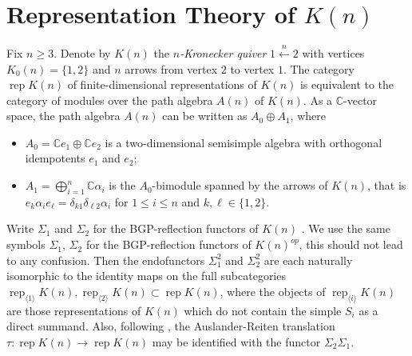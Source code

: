 \documentclass{amsart}
\newcommand{\rep}{\operatorname{rep}}
\newcommand{\CC}{\mathbb{C}}
\begin{document}
\section{Representation Theory of $K(n)$}

Fix $n\ge3$. Denote by $K(n)$ the \emph{$n$-Kronecker quiver} $1\stackrel{n}{\longleftarrow}2$ with vertices $K_0(n)=\{1,2\}$ and $n$ arrows from vertex $2$ to vertex $1$. 
The category $\rep K(n)$ of finite-dimensional representations of $K(n)$ is equivalent to the category of modules over the path algebra $A(n)$ of $K(n)$.
As a $\CC$-vector space, the path algebra $A(n)$ can be written as $A_0\oplus A_1$, where 
\begin{itemize}
  \item $A_0=\CC e_1\oplus \CC e_2$ is a two-dimensional semisimple algebra with orthogonal idempotents $e_1$ and $e_2$;
  \item $A_1=\bigoplus_{i=1}^n \CC\alpha_i$ is the $A_0$-bimodule spanned by the arrows of $K(n)$, that is $e_k\alpha_ie_\ell=\delta_{k1}\delta_{\ell2}\alpha_i$ for $1\le i\le n$ and $k,\ell\in\{1,2\}$.
\end{itemize}

Write $\Sigma_1$ and $\Sigma_2$ for the BGP-reflection functors of $K(n)$ \cite{bgp}. 
We use the same symbols $\Sigma_1$, $\Sigma_2$ for the BGP-reflection functors of $K(n)^{op}$, this should not lead to any confusion. 
Then the endofunctors $\Sigma_1^2$ and $\Sigma_2^2$ are each naturally isomorphic to the identity maps on the full subcategories $\rep_{\langle 1\rangle} K(n),\rep_{\langle 2\rangle} K(n)\subset \rep K(n)$, where the objects of $\rep_{\langle i\rangle} K(n)$ are those representations of $K(n)$ which do not contain the simple $S_i$ as a direct summand.
Also, following \cite{brenner-butler}, the Auslander-Reiten translation $\tau:\rep K(n)\to\rep K(n)$ may be identified with the functor $\Sigma_2\Sigma_1$.
\end{document}
